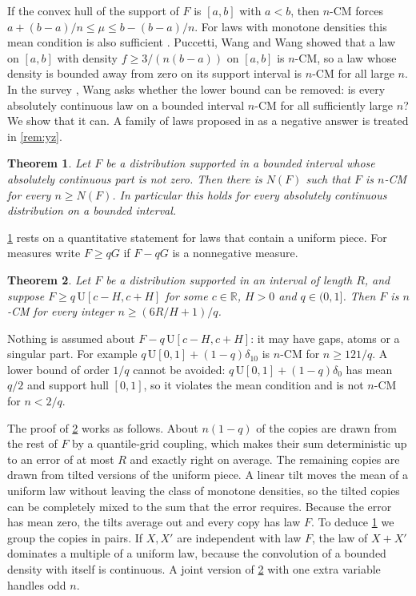 ﻿\documentclass[11pt]{amsart}
\newtheorem{theorem}{Theorem}[section]
\theoremstyle{remark}
\newcommand{\U}{\mathrm{U}}
\begin{document}
If the convex hull of the support of $F$ is $[a,b]$ with $a<b$, then $n$-CM forces $a+(b-a)/n\le\mu\le b-(b-a)/n$. For laws with monotone densities this mean condition is also sufficient \cite{WW11}. Puccetti, Wang and Wang \cite{PWW13} showed that a law on $[a,b]$ with density $f\ge 3/(n(b-a))$ on $[a,b]$ is $n$-CM, so a law whose density is bounded away from zero on its support interval is $n$-CM for all large $n$. In the survey \cite[Open Problem~7]{Wang15}, Wang asks whether the lower bound can be removed: is every absolutely continuous law on a bounded interval $n$-CM for all sufficiently large $n$? We show that it can. A family of laws proposed in \cite{YZ} as a negative answer is treated in \cref{rem:yz}.

\begin{theorem}\label{thm:op7}
Let $F$ be a distribution supported in a bounded interval whose absolutely continuous part is not zero. Then there is $N(F)$ such that $F$ is $n$-CM for every $n\ge N(F)$. In particular this holds for every absolutely continuous distribution on a bounded interval.
\end{theorem}

\cref{thm:op7} rests on a quantitative statement for laws that contain a uniform piece. For measures write $F\ge qG$ if $F-qG$ is a nonnegative measure.

\begin{theorem}\label{thm:main}
Let $F$ be a distribution supported in an interval of length $R$, and suppose $F\ge q\,\U[c-H,c+H]$ for some $c\in\mathbb R$, $H>0$ and $q\in(0,1]$. Then $F$ is $n$-CM for every integer $n\ge(6R/H+1)/q$.
\end{theorem}

Nothing is assumed about $F-q\,\U[c-H,c+H]$: it may have gaps, atoms or a singular part. For example $q\,\U[0,1]+(1-q)\delta_{10}$ is $n$-CM for $n\ge 121/q$. A lower bound of order $1/q$ cannot be avoided: $q\,\U[0,1]+(1-q)\delta_0$ has mean $q/2$ and support hull $[0,1]$, so it violates the mean condition and is not $n$-CM for $n<2/q$.

The proof of \cref{thm:main} works as follows. About $n(1-q)$ of the copies are drawn from the rest of $F$ by a quantile-grid coupling, which makes their sum deterministic up to an error of at most $R$ and exactly right on average. The remaining copies are drawn from tilted versions of the uniform piece. A linear tilt moves the mean of a uniform law without leaving the class of monotone densities, so the tilted copies can be completely mixed to the sum that the error requires. Because the error has mean zero, the tilts average out and every copy has law $F$. To deduce \cref{thm:op7} we group the copies in pairs. If $X,X'$ are independent with law $F$, the law of $X+X'$ dominates a multiple of a uniform law, because the convolution of a bounded density with itself is continuous. A joint version of \cref{thm:main} with one extra variable handles odd $n$.
\end{document}
